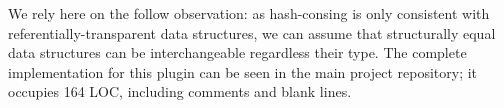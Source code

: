 We rely here on the follow observation: as hash-consing is only consistent with referentially-transparent data structures, we can assume
that structurally equal data structures can be interchangeable regardless their type. The complete implementation for this plugin can be seen in the main project
repository; it occupies 164 LOC, including comments and blank lines.

\begin{comment}
  method trait_name = trait_name

  (* Default inherited attribute is a predefined in GT type of hash table *)
  method main_inh ~loc _tdecl = ht_typ ~loc

  (* The same for default synthsized attribute *)
  method main_syn ~loc ?in_class tdecl =
    Typ.tuple ~loc
      [ ht_typ ~loc
      ; Typ.use_tdecl tdecl
      ]

  (* Inherited attribute for parameter is the same as default one *)
  method inh_of_param tdecl _name = ht_typ ~loc:(loc_from_caml tdecl.ptype_loc)

  (* The synthesized attribute of hashconsing is a tuple of new value and
     a new hash table
  *)
  method syn_of_param ~loc s =
    Typ.tuple ~loc
      [ ht_typ ~loc
      ; Typ.var ~loc s
      ]
      
  (* Type parameters of the class are type parameters of type being processed
     plus extra parameter to support polymorphic variants *)
  method plugin_class_params tdecl =
    let ps =
      List.map tdecl.ptype_params ~f:(fun (t,_) -> typ_arg_of_core_type t)
    in
    ps @
    [ named_type_arg ~loc:(loc_from_caml tdecl.ptype_loc) @@
      Naming.make_extra_param tdecl.ptype_name.txt
    ]

  (* when we will inherrit trait class we will use these type parameters.
     An extra argument for polymorphic variants will be added on call site.
  *)
  method prepare_inherit_typ_params_for_alias ~loc tdecl rhs_args =
    List.map rhs_args ~f:Typ.from_caml


\end{comment}
